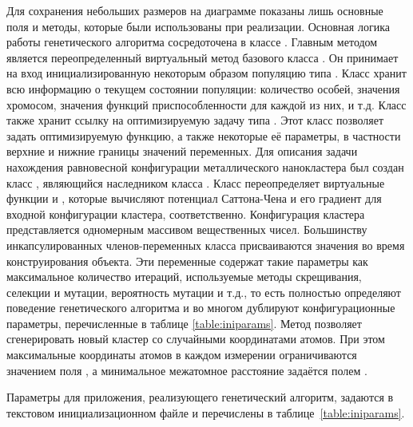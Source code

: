 Для сохранения небольших размеров на диаграмме показаны лишь основные поля и методы,
которые были использованы при реализации. Основная логика работы генетического алгоритма
сосредоточена в классе . Главным методом
является переопределенный виртуальный метод базового класса .
Он принимает на вход инициализированную некоторым образом популяцию типа .
Класс  хранит всю информацию о текущем состоянии популяции:
количество особей, значения хромосом, значения функций приспособленности для каждой из
них, и т.д. Класс  также хранит ссылку на оптимизируемую задачу типа
. Этот класс позволяет задать оптимизируемую функцию, а также некоторые её
параметры, в частности верхние и нижние границы значений переменных. Для описания задачи нахождения
равновесной конфигурации металлического нанокластера был создан класс ,
являющийся наследником класса . Класс 
переопределяет виртуальные функции  и , которые вычисляют
потенциал Саттона-Чена и его градиент для входной конфигурации кластера, соответственно.
Конфигурация кластера представляется одномерным массивом вещественных чисел. Большинству инкапсулированных
членов-переменных класса  присваиваются значения во
время конструирования объекта. Эти переменные содержат такие параметры как максимальное количество итераций,
используемые методы скрещивания, селекции и мутации, вероятность мутации и т.д., то есть полностью определяют
поведение генетического алгоритма и во многом дублируют конфигурационные параметры, перечисленные в таблице
\ref{table:iniparams}. Метод  позволяет сгенерировать новый кластер
со случайными координатами атомов. При этом максимальные координаты атомов в каждом измерении ограничиваются
значением поля , а минимальное межатомное расстояние задаётся полем
.


Параметры для приложения, реализующего генетический алгоритм, задаются в текстовом
инициализационном файле и перечислены в таблице~\ref{table:iniparams}.


